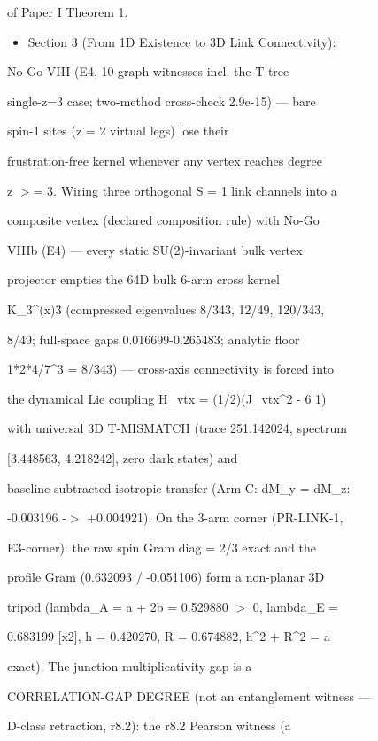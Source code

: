 \documentclass[11pt,a4paper]{article}
\theoremstyle{definition}
\begin{document}
    of Paper I Theorem 1.

\begin{itemize}[leftmargin=1.4em]
\item Section 3 (From 1D Existence to 3D Link Connectivity):
\end{itemize}
    No-Go VIII (E4, 10 graph witnesses incl. the T-tree

    single-z=3 case; two-method cross-check 2.9e-15) — bare

    spin-1 sites (z = 2 virtual legs) lose their

    frustration-free kernel whenever any vertex reaches degree

    z $>$= 3. Wiring three orthogonal S = 1 link channels into a

    composite vertex (declared composition rule) with No-Go

    VIIIb (E4) — every static SU(2)-invariant bulk vertex

    projector empties the 64D bulk 6-arm cross kernel

    K\_3\^{}{(x)3} (compressed eigenvalues 8/343, 12/49, 120/343,

    8/49; full-space gaps 0.016699-0.265483; analytic floor

    1*2*4/7\^{}3 = 8/343) — cross-axis connectivity is forced into

    the dynamical Lie coupling H\_vtx = (1/2)(J\_vtx\^{}2 - 6 1)

    with universal 3D T-MISMATCH (trace 251.142024, spectrum

    [3.448563, 4.218242], zero dark states) and

    baseline-subtracted isotropic transfer (Arm C: dM\_y = dM\_z:

    -0.003196 -$>$ +0.004921). On the 3-arm corner (PR-LINK-1,

    E3-corner): the raw spin Gram diag = 2/3 exact and the

    profile Gram (0.632093 / -0.051106) form a non-planar 3D

    tripod (lambda\_A = a + 2b = 0.529880 $>$ 0, lambda\_E =

    0.683199 [x2], h = 0.420270, R = 0.674882, h\^{}2 + R\^{}2 = a

    exact). The junction multiplicativity gap is a

    CORRELATION-GAP DEGREE (not an entanglement witness —

    D-class retraction, r8.2): the r8.2 Pearson witness (a
\end{document}
